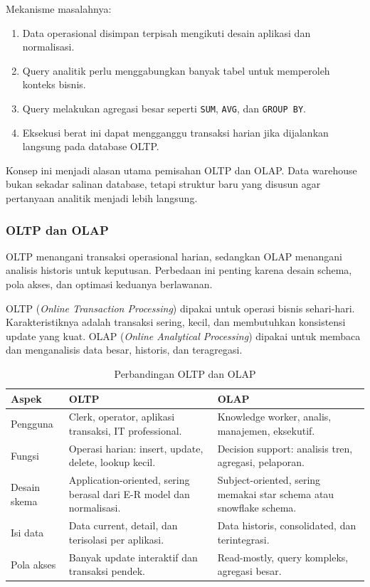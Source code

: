 Mekanisme masalahnya:
\begin{enumerate}
    \item Data operasional disimpan terpisah mengikuti desain aplikasi dan normalisasi.
    \item Query analitik perlu menggabungkan banyak tabel untuk memperoleh konteks bisnis.
    \item Query melakukan agregasi besar seperti \texttt{SUM}, \texttt{AVG}, dan \texttt{GROUP BY}.
    \item Eksekusi berat ini dapat mengganggu transaksi harian jika dijalankan langsung pada database OLTP.
\end{enumerate}

Konsep ini menjadi alasan utama pemisahan OLTP dan OLAP. Data warehouse bukan sekadar salinan database, tetapi struktur baru yang disusun agar pertanyaan analitik menjadi lebih langsung.

\subsubsection{OLTP dan OLAP}

\begin{jawab}
OLTP menangani transaksi operasional harian, sedangkan OLAP menangani analisis historis untuk keputusan. Perbedaan ini penting karena desain schema, pola akses, dan optimasi keduanya berlawanan.
\end{jawab}

OLTP (\textit{Online Transaction Processing}) dipakai untuk operasi bisnis sehari-hari. Karakteristiknya adalah transaksi sering, kecil, dan membutuhkan konsistensi update yang kuat. OLAP (\textit{Online Analytical Processing}) dipakai untuk membaca dan menganalisis data besar, historis, dan teragregasi.

\begin{table}[H]
\centering
\begin{tabularx}{\textwidth}{|L{0.20\textwidth}|X|X|}
\hline
\textbf{Aspek} & \textbf{OLTP} & \textbf{OLAP} \\
\hline
Pengguna & Clerk, operator, aplikasi transaksi, IT professional. & Knowledge worker, analis, manajemen, eksekutif. \\
\hline
Fungsi & Operasi harian: insert, update, delete, lookup kecil. & Decision support: analisis tren, agregasi, pelaporan. \\
\hline
Desain skema & Application-oriented, sering berasal dari E-R model dan normalisasi. & Subject-oriented, sering memakai star schema atau snowflake schema. \\
\hline
Isi data & Data current, detail, dan terisolasi per aplikasi. & Data historis, consolidated, dan terintegrasi. \\
\hline
Pola akses & Banyak update interaktif dan transaksi pendek. & Read-mostly, query kompleks, agregasi besar. \\
\hline
\end{tabularx}
\caption{Perbandingan OLTP dan OLAP}
\label{tab:oltp-olap}
\end{table}


